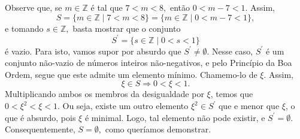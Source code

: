 \documentclass[12pt, a4paper]{article}
\begin{document}
\begin{solution}
Observe que, se $m \in \mathbb{Z}$ é tal que $7 < m < 8,$ então $0 < m - 7 < 1.$ Assim,
\[
S = \{ m \in \mathbb{Z} \mid 7 < m < 8 \} = \{ m \in \mathbb{Z} \mid 0 < m-7 < 1 \},
\]
e tomando $s \in \mathbb{Z},$ basta mostrar que o conjunto 
\[
S^{\prime} =  \{ s \in \mathbb{Z} \mid 0 < s < 1 \}
\]
é vazio. Para isto, vamos supor por absurdo que $S^{\prime} \neq \emptyset.$ Nesse caso, $S^{\prime}$ é um conjunto não-vazio de números inteiros não-negativos, e pelo Princípio da Boa Ordem, segue que este admite um elemento mínimo. Chamemo-lo de $\xi.$ Assim,
\[
\xi \in S \Rightarrow 0 < \xi < 1.
\]
Multiplicando ambos os membros da desigualdade por $\xi$, temos que $0 < \xi^2 < \xi < 1.$ Ou seja, existe um outro elemento $\xi^2 \in S^{\prime}$ que e menor que $\xi$, o que é absurdo, pois $\xi$ é minimal. Logo, tal elemento não pode existir, e $S^{\prime} = \emptyset.$ Consequentemente, $S = \emptyset,$ como queríamos demonstrar.
\end{solution}
\end{document}
